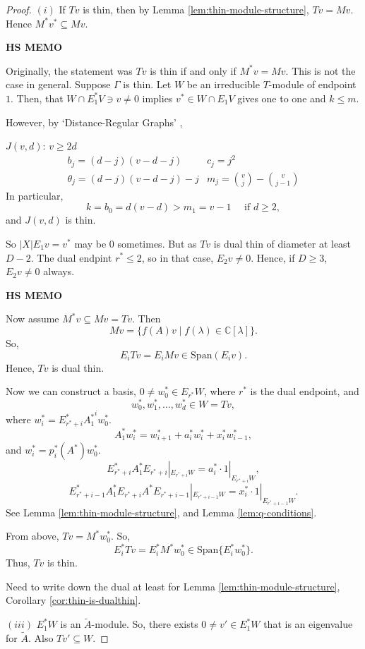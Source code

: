 \documentclass[
]{book}
\theoremstyle{definition}
\theoremstyle{definition}
\theoremstyle{definition}
\theoremstyle{definition}
\theoremstyle{remark}
\begin{document}
\begin{proof}
\leavevmode

\((i)\) If \(Tv\) is thin, then by Lemma \ref{lem:thin-module-structure}, \(Tv = Mv\). Hence \(M^*v^* \subseteq Mv\).

\textbf{HS MEMO}

Originally, the statement was \(Tv\) is thin if and only if \(M^*v = Mv\). This is not the case in general. Suppose \(\Gamma\) is thin. Let \(W\) be an irreducible \(T\)-module of endpoint \(1\). Then, that \(W \cap E^*_1V \ni v \neq 0\) implies \(v^*\in W\cap E_1V\) gives one to one and \(k\leq m\).

However, by `Distance-Regular Graphs' \citep{bcn},

\(J(v,d)\): \(v\geq 2d\)
\begin{align}
b_j = (d-j)(v-d-j) & c_j = j^2\\
\theta_j = (d-j)(v-d-j)-j & m_j = \binom{v}{j}-\binom{v}{j-1}
\end{align}
In particular,
\[k = b_0 = d(v-d) > m_1 = v-1 \quad \text{ if }d\geq 2,\]
and \(J(v,d)\) is thin.

So \(|X|E_1v = v^*\) may be \(0\) sometimes. But as \(Tv\) is dual thin of diameter at least \(D-2\). The dual endpint \(r^*\leq 2\), so in that case, \(E_2v \neq 0\). Hence, if \(D\geq 3\), \(E_2v\neq 0\) always.

\textbf{HS MEMO}

Now assume \(M^*v\subseteq Mv = Tv\). Then
\[Mv = \{f(A)v\mid f(\lambda)\in \mathbb{C}[\lambda]\}.\]
So,
\[E_iTv = E_iMv \in \mathrm{Span}(E_iv).\]
Hence, \(Tv\) is dual thin.

Now we can construct a basis,
\(0\neq w^*_0\in E_{r^*}W\), where \(r^*\) is the dual endpoint, and
\[w^*_0, w^*_1, \ldots, w^*_d\in W = Tv,\]
where \(w^*_i = E^*_{r^*+i}{A^*_1}^iw^*_0\).
\[A^*_1w^*_i = w^*_{i+1}+ a_i^*w^*_i + x^*_iw^*_{i-1},\]
and \(w^*_i = p^*_i(A^*)w^*_0\).
\[E^*_{r^*+i}A^*_1E_{r^*+i}|_{E_{r^*+i}W} = a^*_i\cdot 1|_{E_{r^*+i}W},\]
\[E^*_{r^*+i-1}A^*_1E_{r^*+i}A^*E_{r^*+i-1}|_{E_{r^*+i-1}W} = x^*_i\cdot 1|_{E_{r^*+i-1}W}.\]
See Lemma \ref{lem:thin-module-structure}, and Lemma \ref{lem:q-conditions}.

From above, \(Tv = M^*w^*_0\). So,
\[E^*_iTv = E^*_iM^*w^*_0 \in \mathrm{Span}\{E^*_iw^*_0\}.\]
Thus, \(Tv\) is thin.

\ast Need to write down the dual at least for Lemma \ref{lem:thin-module-structure}, Corollary \ref{cor:thin-is-dualthin}.

\((iii)\) \(E^*_1W\) is an \(\tilde{A}\)-module. So, there exists \(0\neq v'\in E^*_1W\) that is an eigenvalue for \(\tilde{A}\). Also \(Tv' \subseteq W\).


\end{proof}
\end{document}
